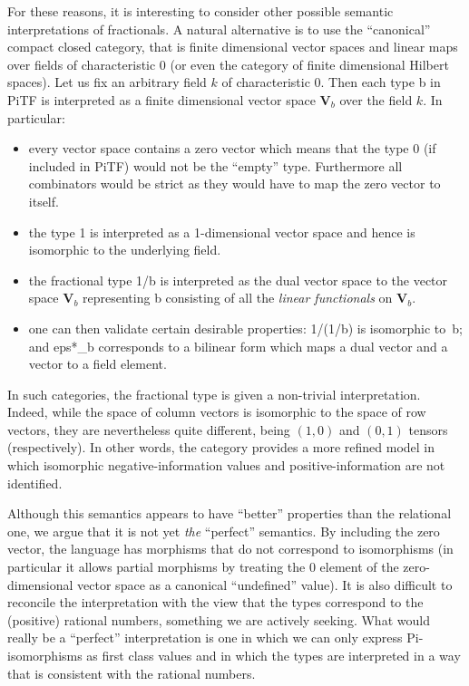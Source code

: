 \documentclass[preprint]{sigplanconf}
\begin{document}
For these reasons, it is interesting to consider other possible semantic
interpretations of fractionals. A natural alternative is to use the
``canonical'' compact closed category, that is finite dimensional vector
spaces and linear
maps~\cite{Selinger:2011:FDH:1942319.1942398,hasegawa2008finite}
over fields of characteristic $0$ (or even the category of finite dimensional
Hilbert spaces). Let us fix an arbitrary field $k$ of characteristic $0$.
Then each type {{b}} in {{PiTF}} is interpreted as a finite dimensional
vector space $\mathbf{V}_b$ over the field $k$. In particular:
\begin{itemize}
  \item every vector space contains a zero vector which means that the type
    {{0}} (if included in {{PiTF}}) would not be the ``empty'' type.
    Furthermore all combinators would be
    strict as they would have to map the zero vector to itself. 
  \item the type {{1}} is interpreted as a 1-dimensional vector space and hence
    is isomorphic to the underlying field.
  \item the fractional type {{1/b}} is interpreted as the dual vector space
    to the vector space $\mathbf{V}_b$ representing {{b}} consisting of all
    the \emph{linear functionals} on $\mathbf{V}_b$.
  \item one can then validate certain desirable properties: {{1/(1/b)}} is
    isomorphic to~{{b}}; and {{eps*_b}} corresponds to a bilinear form which
    maps a dual vector and a vector to a field element.
\end{itemize}

In such categories, the fractional type is given a non-trivial
interpretation. Indeed, while the space of column vectors is isomorphic to
the space of row vectors, they are nevertheless quite different, being
$(1,0)$ and $(0,1)$ tensors (respectively).  In other words, the category
provides a more refined model in which isomorphic negative-information values
and positive-information are not identified.

Although this semantics appears to have ``better'' properties than the
relational one, we argue that it is not yet \emph{the} ``perfect''
semantics. By including the zero vector, the language has morphisms that do
not correspond to isomorphisms (in particular it allows partial morphisms by
treating the {{0}} element of the zero-dimensional vector space as a
canonical ``undefined'' value).  It is also difficult to reconcile the
interpretation with the view that the types correspond to the (positive)
rational numbers, something we are actively seeking. What would really be a
``perfect'' interpretation is one in which we can only express
{{Pi}}-isomorphisms as first class values and in which the types are
interpreted in a way that is consistent with the rational numbers.
\end{document}
